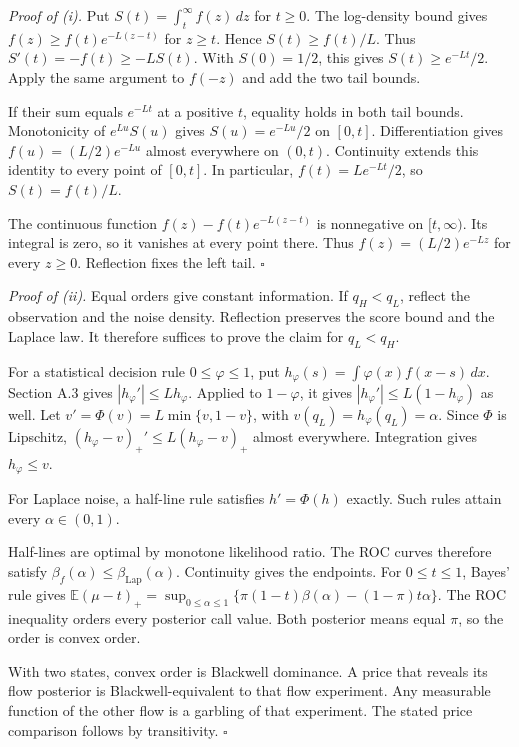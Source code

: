 \emph{Proof of (i).} Put \(S(t)=\int_t^\infty f(z)\,dz\) for \(t\ge0\).
The log-density bound gives \(f(z)\ge f(t)e^{-L(z-t)}\) for \(z\ge t\).
Hence \(S(t)\ge f(t)/L\).
Thus \(S'(t)=-f(t)\ge-LS(t)\).
With \(S(0)=1/2\), this gives \(S(t)\ge e^{-Lt}/2\).
Apply the same argument to \(f(-z)\) and add the two tail bounds.
\par
If their sum equals \(e^{-Lt}\) at a positive \(t\), equality holds in both tail bounds.
Monotonicity of \(e^{Lu}S(u)\) gives \(S(u)=e^{-Lu}/2\) on \([0,t]\).
Differentiation gives \(f(u)=(L/2)e^{-Lu}\) almost everywhere on \((0,t)\).
Continuity extends this identity to every point of \([0,t]\).
In particular, \(f(t)=Le^{-Lt}/2\), so \(S(t)=f(t)/L\).
\par
The continuous function \(f(z)-f(t)e^{-L(z-t)}\) is nonnegative on \([t,\infty)\).
Its integral is zero, so it vanishes at every point there.
Thus \(f(z)=(L/2)e^{-Lz}\) for every \(z\ge0\).
Reflection fixes the left tail. \(\square\)

\emph{Proof of (ii).} Equal orders give constant information.
If \(q_H<q_L\), reflect the observation and the noise density.
Reflection preserves the score bound and the Laplace law.
It therefore suffices to prove the claim for \(q_L<q_H\).
\par
For a statistical decision rule \(0\le\varphi\le1\), put \(h_\varphi(s)=\int\varphi(x)f(x-s)\,dx\).
Section A.3 gives \(|h_\varphi'|\le Lh_\varphi\).
Applied to \(1-\varphi\), it gives \(|h_\varphi'|\le L(1-h_\varphi)\) as well.
Let \(v'=\Phi(v)=L\min\{v,1-v\}\), with \(v(q_L)=h_\varphi(q_L)=\alpha\).
Since \(\Phi\) is Lipschitz, \((h_\varphi-v)_+'\le L(h_\varphi-v)_+\) almost everywhere.
Integration gives \(h_\varphi\le v\).
\par
For Laplace noise, a half-line rule satisfies \(h'=\Phi(h)\) exactly.
Such rules attain every \(\alpha\in(0,1)\).
\par
Half-lines are optimal by monotone likelihood ratio.
The ROC curves therefore satisfy \(\beta_f(\alpha)\le\beta_{\mathrm{Lap}}(\alpha)\).
Continuity gives the endpoints.
For \(0\le t\le1\), Bayes' rule gives \(\mathbb E(\mu-t)_+=\sup_{0\le\alpha\le1}\{\pi(1-t)\beta(\alpha)-(1-\pi)t\alpha\}\).
The ROC inequality orders every posterior call value.
Both posterior means equal \(\pi\), so the order is convex order.
\par
With two states, convex order is Blackwell dominance.
A price that reveals its flow posterior is Blackwell-equivalent to that flow experiment.
Any measurable function of the other flow is a garbling of that experiment.
The stated price comparison follows by transitivity. \(\square\)

